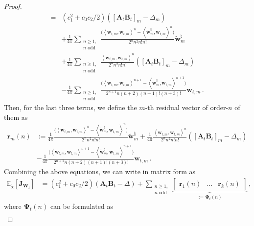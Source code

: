 \begin{proof}
\begin{align*}
    = &  \left(c_1^2+c_0 c_2 / 2\right) \left(\left[\bm A_t \bm B_t \right]_{m}-\Delta_m\right)\\
    & + \frac{1}{4\pi} \sum_{\substack{n\geq 1, \\ n \text{ odd}}} \frac{\bigg(\left\langle{\bm w}_{t,m},{\bm w}_{t,m}\right\rangle^{n}-\left\langle\widetilde{\bm w}^\natural_m,{\bm w}_{t,m}\right\rangle^{n}\bigg)}{2^{n} n^2 n! n!}  \widetilde{\bm w}^\natural_m\\
    & + \frac{1}{4\pi} \sum_{\substack{n\geq 1, \\ n \text{ odd}}} \frac{\left\langle{\bm w}_{t,m},{\bm w}_{t,m}\right\rangle^n}{2^{n} n^2 n! n!}\left(\left[\bm A_t \bm B_t \right]_{m}-\Delta_m\right)\\
    & -\frac{1}{4\pi}\sum_{\substack{n\geq 1,\\n\text{ odd}}}\frac{\bigg(\left\langle{\bm w}_{t,m},{\bm w}_{t,m}\right\rangle^{n+1}-\left\langle\widetilde{\bm w}^\natural_m,{\bm w}_{t,m}\right\rangle^{n+1}\bigg)}{2^{n+1} n(n + 2)(n+1)!(n+3)!}{\bm w}_{t,m}\,.
\end{align*}
Then, for the last three terms, we define the $m$-th residual vector of order-$n$ of them as
\begin{align*}
    \bm r_m(n)&:=\frac{1}{4\pi} \frac{\bigg(\left\langle{\bm w}_{t,m},{\bm w}_{t,m}\right\rangle^{n}-\left\langle\widetilde{\bm w}^\natural_m,{\bm w}_{t,m}\right\rangle^{n}\bigg)}{2^{n} n^2 n! n!}  \widetilde{\bm w}^\natural_m
     + \frac{1}{4\pi} \frac{\left\langle{\bm w}_{t,m},{\bm w}_{t,m}\right\rangle^n}{2^{n} n^2 n! n!}\left(\left[\bm A_t \bm B_t \right]_{m}-\Delta_m\right)\\
    &-\frac{1}{4\pi}\frac{\bigg(\left\langle{\bm w}_{t,m},{\bm w}_{t,m}\right\rangle^{n+1}-\left\langle\widetilde{\bm w}^\natural_m,{\bm w}_{t,m}\right\rangle^{n+1}\bigg)}{2^{n+1} n(n + 2)(n+1)!(n+3)!}{\bm w}_{t,m}\,.
\end{align*}
Combining the above equations, we can write in matrix form as
\begin{align*}
    \mathbb{E}_{\widetilde{\bm x}}\left[ \bm J_{\bm W_t} \right] & = \left(c_1^2+c_0 c_2 / 2\right)\left(\bm A_t \bm B_t - \Delta\right)+\sum_{\substack{n\geq 1,\\n\text{ odd}}}\underbrace{\begin{bmatrix}
        \bm r_1(n) & \hdots & \bm r_k(n)
    \end{bmatrix}}_{:=\bm \Psi_t(n)}\,,
\end{align*}
where $\bm \Psi_t(n)$ can be formulated as
\begin{align}

\end{align}
\end{proof}
